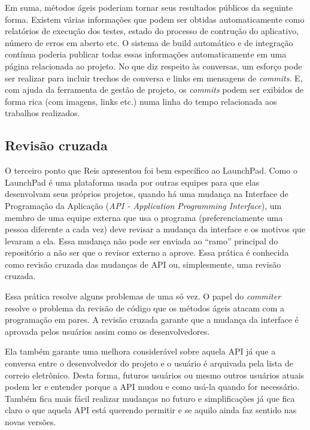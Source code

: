 Em suma, métodos ágeis poderiam tornar seus resultados públicos da
seguinte forma. Existem várias informações que podem ser obtidas
automaticamente como relatórios de execução dos testes, estado do
processo de contrução do aplicativo, número de erros em aberto etc.
O sistema de build automático e de integração contínua poderia
publicar todas essas informações automaticamente em uma página
relacionada ao projeto. No que diz respeito às conversas, um esforço
pode ser realizar para incluir trechos de conversa e links em
mensagens de \textit{commits}. E, com ajuda da ferramenta de gestão de
projeto, os \textit{commits} podem ser exibidos de forma rica (com
imagens, links etc.) numa linha do tempo relacionada aos trabalhos
realizados.

\subsection{Revisão cruzada}
\label{subsec:crossrev}

O terceiro ponto que Reis apresentou foi bem específico ao
LaunchPad. Como o LaunchPad é uma plataforma usada por outras equipes
para que elas desenvolvam seus próprios projetos, quando há uma
mudança na Interface de Programação da Aplicação (\emph{API -
  Application Programming Interface}), um membro de uma equipe externa
que usa o programa (preferenciamente uma pessoa diferente a cada vez)
deve revisar a mudança da interface e os motivos que levaram a
ela. Essa mudança não pode ser enviada ao ``ramo'' principal do
repositório a não ser que o revisor externo a aprove. Essa prática é
conhecida como revisão cruzada das mudanças de API ou, simplesmente,
uma revisão cruzada.

Essa prática resolve alguns problemas de uma só vez. O papel do
\emph{commiter} resolve o problema da revisão de código que os métodos
ágeis atacam com a programação em pares. A revisão cruzada garante que
a mudança da interface é aprovada pelos usuários assim como os
desenvolvedores.

Ela também garante uma melhora considerável sobre aquela API já que a
conversa entre o desenvolvedor do projeto e o usuário é arquivada pela
lista de correio eletrônico. Desta forma, futuros usuários ou mesmo
outros usuários atuais podem ler e entender porque a API mudou e como
usá-la quando for necessário. Também fica mais fácil realizar mudanças
no futuro e simplificações já que fica claro o que aquela API está
querendo permitir e se aquilo ainda faz sentido nas novas versões.

